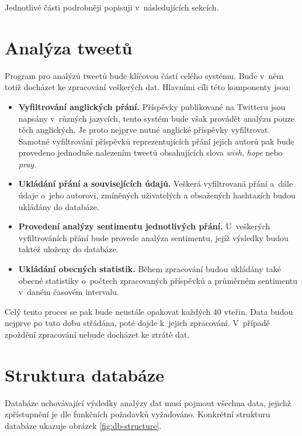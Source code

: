 \documentclass[thesis=B,czech]{FITthesis}[2012/06/26]
\begin{document}
\noindent Jednotlivé části podrobněji popisuji v~následujících sekcích. 

\section{Analýza tweetů}
	Program pro analýzů tweetů bude klíčovou částí celého systému. Bude v~něm totiž docházet ke zpracování veškerých dat. Hlavními cíli této komponenty jsou:
	
\begin{itemize}
\item \textbf{Vyfiltrování anglických přání.} Příspěvky publikované na Twitteru jsou napsány v~různých jazycích, tento systém bude však provádět analýzu pouze těch anglických. Je proto nejprve nutné anglické příspěvky vyfiltrovat. Samotné vyfiltrování příspěvků reprezentujících přání jejich autorů pak bude provedeno jednoduše nalezením tweetů obsahujících slova \textit{wish}, \textit{hope} nebo \textit{pray}. 
\item \textbf{Ukládání přání a souvisejících údajů.} Veškerá vyfiltrovaná přání a~dále údaje o~jeho autorovi, zmíněných uživatelých a obsažených hashtazích budou ukládány do databáze. 
\item \textbf{Provedení analýzy sentimentu jednotlivých přání.} U~veškerých vyfiltrováních přání bude provede analýza sentimentu, jejíž výsledky budou taktéž uloženy do databáze. 
\item \textbf{Ukládání obecných statistik.} Během zpracování budou ukládány také obecné statistiky o~počtech zpracovaných příspěvků a průměrném sentimentu v~daném časovém intervalu. 
\end{itemize}

Celý tento proces se pak bude neustále opakovat každých 40 vteřin. Data budou nejprve po tuto dobu střádána, poté dojde k~jejich zpracování. V~případě zpoždění zpracování nebude docházet ke ztrátě dat. 

\section{Struktura databáze}
Databáze uchovávající výsledky analýzy dat musí pojmout všechna data, jejichž zpřístupnění je dle funkčních požadavků vyžadováno. Konkrétní strukturu databáze ukazuje obrázek \ref{fig:db-structure}. 
\end{document}
